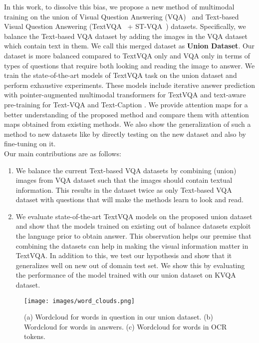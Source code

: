 \documentclass[10pt,twocolumn,letterpaper]{article}
\begin{document}
In this work, to dissolve this bias, we propose a new method of multimodal training on the union of Visual Question Answering (VQA)~\cite{first-vqa:2017} and Text-based Visual Question Answering (TextVQA~\cite{textVQA} + ST-VQA~\cite{stvqa}) datasets. Specifically, we balance the Text-based VQA dataset by adding the images in the VQA dataset which contain text in them. We call this merged dataset as \textbf{Union Dataset}. Our dataset is more balanced compared to TextVQA only and VQA only in terms of types of questions that require both looking and reading the image to answer. We train the state-of-the-art models of TextVQA task on the union dataset and perform exhaustive experiments. These models include iterative answer prediction with pointer-augmented multimodal transformers for TextVQA \cite{M4C:2020} and text-aware pre-training for Text-VQA and Text-Caption \cite{TAP}. We provide attention maps for a better understanding of the proposed method and compare them with attention maps obtained from existing methods. We also show the generalization of such a method to new datasets like \cite{kvqa} by directly testing on the new dataset and also by fine-tuning on it.\\
Our main contributions are as follows: 
\begin{enumerate}
    \item We balance the current Text-based VQA datasets by combining (union) images from VQA dataset such that the images should contain textual information. This results in the dataset twice as only Text-based VQA dataset with questions that will make the methods learn to look and read.
    \item We evaluate state-of-the-art TextVQA models on the proposed union dataset and show that the models trained on existing out of balance datasets exploit the language prior to obtain answer. This observation helps our premise that combining the datasets can help in making the visual information matter in TextVQA. In addition to this, we test our hypothesis and show that it generalizes well on new out of domain test set. We show this by evaluating the performance of the model trained with our union dataset on KVQA \cite{kvqa} dataset.
\end{enumerate}


\begin{figure}
    \centering
    \texttt{[image: images/word\_clouds.png]}
    \caption{ (a) Wordcloud for words in question in our union dataset. (b) Wordcloud for words in answers. (c) Wordcloud for words in OCR tokens.
    } 
    \label{fig:wordcloud}
\end{figure}
\end{document}
